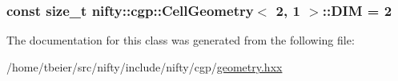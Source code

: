 \subsubsection[{D\+I\+M}]{\setlength{\rightskip}{0pt plus 5cm}const size\+\_\+t {\bf nifty\+::cgp\+::\+Cell\+Geometry}$<$ 2, 1 $>$\+::D\+I\+M = 2\hspace{0.3cm}{\ttfamily [static]}}\label{classnifty_1_1cgp_1_1CellGeometry_3_012_00_011_01_4_a42d125e23384bc4a770893276750d9d1}


The documentation for this class was generated from the following file\+:\begin{DoxyCompactItemize}
\item 
/home/tbeier/src/nifty/include/nifty/cgp/\hyperlink{geometry_8hxx}{geometry.\+hxx}\end{DoxyCompactItemize}
